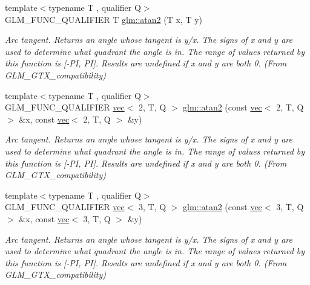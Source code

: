 \begin{DoxyCompactItemize}
{\footnotesize template$<$typename T , qualifier Q$>$ }\\G\+L\+M\+\_\+\+F\+U\+N\+C\+\_\+\+Q\+U\+A\+L\+I\+F\+I\+ER T \hyperlink{group__gtx__compatibility_gac63011205bf6d0be82589dc56dd26708}{glm\+::atan2} (T x, T y)
\begin{DoxyCompactList}\small\item\em Arc tangent. Returns an angle whose tangent is y/x. The signs of x and y are used to determine what quadrant the angle is in. The range of values returned by this function is \mbox{[}-\/\+PI, PI\mbox{]}. Results are undefined if x and y are both 0. (From G\+L\+M\+\_\+\+G\+T\+X\+\_\+compatibility) \end{DoxyCompactList}\item 
\mbox{\label{group__gtx__compatibility_ga83bc41bd6f89113ee8006576b12bfc50}} 
{\footnotesize template$<$typename T , qualifier Q$>$ }\\G\+L\+M\+\_\+\+F\+U\+N\+C\+\_\+\+Q\+U\+A\+L\+I\+F\+I\+ER \hyperlink{structglm_1_1vec}{vec}$<$ 2, T, Q $>$ \hyperlink{group__gtx__compatibility_ga83bc41bd6f89113ee8006576b12bfc50}{glm\+::atan2} (const \hyperlink{structglm_1_1vec}{vec}$<$ 2, T, Q $>$ \&x, const \hyperlink{structglm_1_1vec}{vec}$<$ 2, T, Q $>$ \&y)
\begin{DoxyCompactList}\small\item\em Arc tangent. Returns an angle whose tangent is y/x. The signs of x and y are used to determine what quadrant the angle is in. The range of values returned by this function is \mbox{[}-\/\+PI, PI\mbox{]}. Results are undefined if x and y are both 0. (From G\+L\+M\+\_\+\+G\+T\+X\+\_\+compatibility) \end{DoxyCompactList}\item 
\mbox{\label{group__gtx__compatibility_gac39314f5087e7e51e592897cabbc1927}} 
{\footnotesize template$<$typename T , qualifier Q$>$ }\\G\+L\+M\+\_\+\+F\+U\+N\+C\+\_\+\+Q\+U\+A\+L\+I\+F\+I\+ER \hyperlink{structglm_1_1vec}{vec}$<$ 3, T, Q $>$ \hyperlink{group__gtx__compatibility_gac39314f5087e7e51e592897cabbc1927}{glm\+::atan2} (const \hyperlink{structglm_1_1vec}{vec}$<$ 3, T, Q $>$ \&x, const \hyperlink{structglm_1_1vec}{vec}$<$ 3, T, Q $>$ \&y)
\begin{DoxyCompactList}\small\item\em Arc tangent. Returns an angle whose tangent is y/x. The signs of x and y are used to determine what quadrant the angle is in. The range of values returned by this function is \mbox{[}-\/\+PI, PI\mbox{]}. Results are undefined if x and y are both 0. (From G\+L\+M\+\_\+\+G\+T\+X\+\_\+compatibility) \end{DoxyCompactList}\item 

\end{DoxyCompactItemize}
